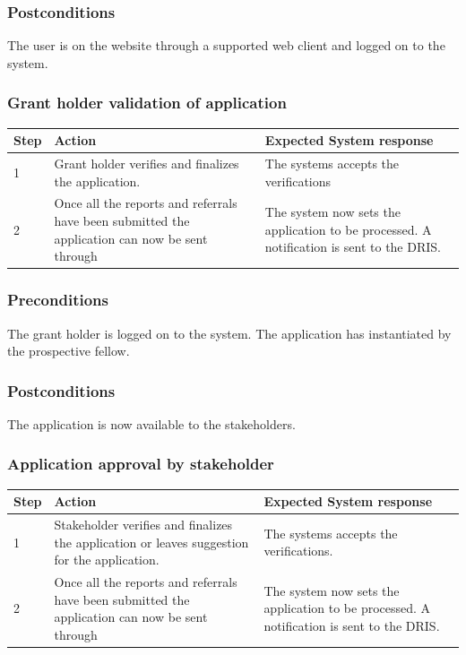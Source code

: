 \documentclass[12pt]{article}
\begin{document}
\subsubsection*{Postconditions}
The user is on the website through a supported web client and logged on to the system.

\subsubsection{Grant holder validation of application}

\begin{center}
\begin{tabular}{|l|p{6cm}|p{8cm}|}
\hline
Step & Action & Expected System response \\
\hline
1 & Grant holder verifies and finalizes the application. & The systems accepts the verifications \\
\hline
2 & Once all the reports and referrals have been submitted the application can now be sent through  & The system now sets the application to be processed. A notification is sent to the DRIS. \\
\hline
\end{tabular}
\end{center}

\subsubsection*{Preconditions}
The grant holder is logged on to the system. The application has instantiated by the prospective fellow.

\subsubsection*{Postconditions}
The application is now available to the stakeholders.

\subsubsection{Application approval by stakeholder}

\begin{center}
\begin{tabular}{|l|p{6cm}|p{8cm}|}
\hline
Step & Action & Expected System response \\
\hline
1 & Stakeholder verifies and finalizes the application or leaves suggestion for the application. & The systems accepts the verifications. \\
\hline
2 & Once all the reports and referrals have been submitted the application can now be sent through  & The system now sets the application to be processed. A notification is sent to the DRIS. \\
\hline
\end{tabular}
\end{center}
\end{document}
